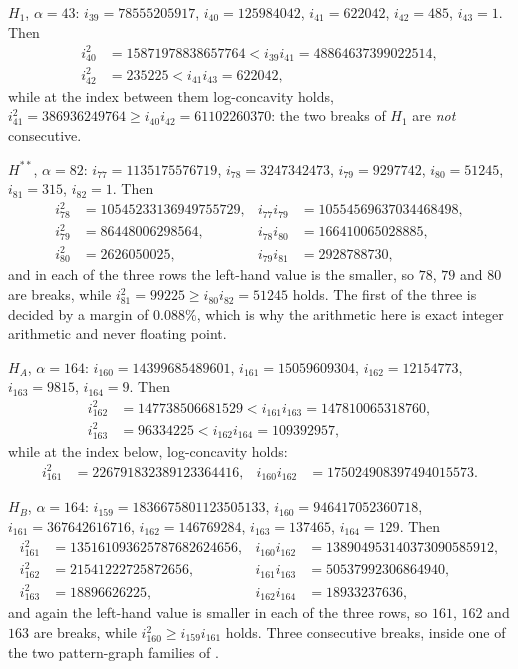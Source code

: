 \documentclass[11pt]{amsart}
\theoremstyle{definition}
\theoremstyle{remark}
\newcommand{\albr}{\alpha}
\begin{document}
\medskip
\noindent$H_1$, $\albr=43$: $i_{39}=78555205917$, $i_{40}=125984042$,
$i_{41}=622042$, $i_{42}=485$, $i_{43}=1$. Then
\begin{align*}
 i_{40}^2&=15871978838657764<i_{39}i_{41}=48864637399022514,\\
 i_{42}^2&=235225<i_{41}i_{43}=622042,
\end{align*}
while at the index between them log-concavity holds,
$i_{41}^2=386936249764\ge i_{40}i_{42}=61102260370$: the two breaks of $H_1$ are
\emph{not} consecutive.

\medskip
\noindent$H^{**}$, $\albr=82$: $i_{77}=1135175576719$, $i_{78}=3247342473$,
$i_{79}=9297742$, $i_{80}=51245$, $i_{81}=315$, $i_{82}=1$. Then
{\footnotesize
\begin{align*}
 i_{78}^2&=10545233136949755729, & i_{77}i_{79}&=10554569637034468498,\\
 i_{79}^2&=86448006298564,       & i_{78}i_{80}&=166410065028885,\\
 i_{80}^2&=2626050025,           & i_{79}i_{81}&=2928788730,
\end{align*}}
\noindent and in each of the three rows the left-hand value is the smaller, so $78$, $79$ and
$80$ are breaks, while $i_{81}^2=99225\ge i_{80}i_{82}=51245$ holds. The first
of the three is decided by a margin of $0.088\%$, which is why the arithmetic here is
exact integer arithmetic and never floating point.

\medskip
\noindent$H_A$, $\albr=164$: $i_{160}=14399685489601$, $i_{161}=15059609304$,
$i_{162}=12154773$, $i_{163}=9815$, $i_{164}=9$. Then
\begin{align*}
 i_{162}^2&=147738506681529<i_{161}i_{163}=147810065318760,\\
 i_{163}^2&=96334225<i_{162}i_{164}=109392957,
\end{align*}
while at the index below, log-concavity holds:
{\footnotesize
\begin{align*}
 i_{161}^2&=226791832389123364416, & i_{160}i_{162}&=175024908397494015573.
\end{align*}}

\medskip
\noindent$H_B$, $\albr=164$: $i_{159}=1836675801123505133$,
$i_{160}=946417052360718$, $i_{161}=367642616716$, $i_{162}=146769284$,
$i_{163}=137465$, $i_{164}=129$. Then
{\footnotesize
\begin{align*}
 i_{161}^2&=135161093625787682624656, & i_{160}i_{162}&=138904953140373090585912,\\
 i_{162}^2&=21541222725872656,        & i_{161}i_{163}&=50537992306864940,\\
 i_{163}^2&=18896626225,              & i_{162}i_{164}&=18933237636,
\end{align*}}
\noindent and again the left-hand value is smaller in each of the three rows, so $161$, $162$ and
$163$ are breaks, while $i_{160}^2\ge i_{159}i_{161}$ holds. Three consecutive breaks,
inside one of the two pattern-graph families of \cite{BRGG}.
\end{document}
